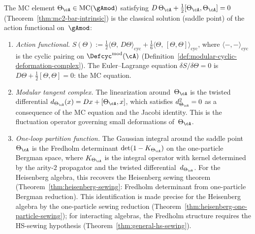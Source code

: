 \begin{proposition}
\label{prop:saddle-point-mc}
\ClaimStatusProvedHere
{}
The MC element $\Theta_\cA \in \operatorname{MC}(\gAmod)$
satisfying $D\,\Theta_\cA + \frac{1}{2}[\Theta_\cA, \Theta_\cA] = 0$
\textup{(}Theorem~\textup{\ref{thm:mc2-bar-intrinsic})} is the
classical solution \textup{(}saddle point\textup{)} of the action
functional on~$\gAmod$:
\begin{enumerate}[label=\textup{(\roman*)}]
\item \emph{Action functional.}
  $S(\Theta) := \frac{1}{2}\langle \Theta,\, D\Theta \rangle_{\mathrm{cyc}}
  + \frac{1}{6}\langle \Theta,\, [\Theta, \Theta] \rangle_{\mathrm{cyc}}$,
  where $\langle{-},{-}\rangle_{\mathrm{cyc}}$ is the cyclic pairing
  on $\Defcyc^{\mathrm{mod}}(\cA)$
  \textup{(}Definition~\textup{\ref{def:modular-cyclic-deformation-complex})}.
  The Euler--Lagrange equation $\delta S / \delta\Theta = 0$ is
  $D\Theta + \frac{1}{2}[\Theta,\Theta] = 0$: the MC equation.

\item \emph{Modular tangent complex.}
  The linearization around~$\Theta_\cA$ is the twisted
  differential
  $d_{\Theta_\cA}(x) = Dx + [\Theta_\cA, x]$, which
  satisfies $d_{\Theta_\cA}^2 = 0$ as a consequence of
  the MC equation and the Jacobi identity.  This is the
  fluctuation operator governing small deformations
  of~$\Theta_\cA$.

\item \emph{One-loop partition function.}
  The Gaussian integral around the saddle point~$\Theta_\cA$
  is the Fredholm determinant
  $\det(1 - K_{\Theta_\cA})$ on the one-particle Bergman
  space, where $K_{\Theta_\cA}$ is the integral operator
  with kernel determined by the arity-$2$ propagator and
  the twisted differential~$d_{\Theta_\cA}$.
  For the Heisenberg algebra, this recovers the
  Heisenberg sewing theorem
  \textup{(}Theorem~\textup{\ref{thm:heisenberg-sewing}}:
  Fredholm determinant from one-particle Bergman reduction\textup{)}.
  This identification is made precise for the Heisenberg algebra
  by the one-particle sewing reduction
  (Theorem~\ref{thm:heisenberg-one-particle-sewing}); for
  interacting algebras, the Fredholm structure requires the
  HS-sewing hypothesis (Theorem~\ref{thm:general-hs-sewing}).
\end{enumerate}
\end{proposition}

